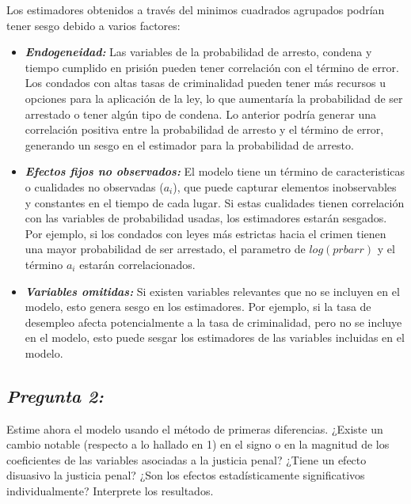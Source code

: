 \documentclass[
  12pt,
]{article}
\begin{document}
Los estimadores obtenidos a través del minimos cuadrados agrupados
podrían tener sesgo debido a varios factores:

\begin{itemize}
\item
  \textbf{\emph{Endogeneidad:}} Las variables de la probabilidad de
  arresto, condena y tiempo cumplido en prisión pueden tener correlación
  con el término de error. Los condados con altas tasas de criminalidad
  pueden tener más recursos u opciones para la aplicación de la ley, lo
  que aumentaría la probabilidad de ser arrestado o tener algún tipo de
  condena. Lo anterior podría generar una correlación positiva entre la
  probabilidad de arresto y el término de error, generando un sesgo en
  el estimador para la probabilidad de arresto.
\item
  \textbf{\emph{Efectos fijos no observados:}} El modelo tiene un
  término de caracteristicas o cualidades no observadas (\(a_i\)), que
  puede capturar elementos inobservables y constantes en el tiempo de
  cada lugar. Si estas cualidades tienen correlación con las variables
  de probabilidad usadas, los estimadores estarán sesgados. Por ejemplo,
  si los condados con leyes más estrictas hacia el crimen tienen una
  mayor probabilidad de ser arrestado, el parametro de \(log(prbarr)\) y
  el término \(a_i\) estarán correlacionados.
\item
  \textbf{\emph{Variables omitidas:}} Si existen variables relevantes
  que no se incluyen en el modelo, esto genera sesgo en los estimadores.
  Por ejemplo, si la tasa de desempleo afecta potencialmente a la tasa
  de criminalidad, pero no se incluye en el modelo, esto puede sesgar
  los estimadores de las variables incluidas en el modelo.
\end{itemize}

\subsection{\texorpdfstring{\textbf{\emph{Pregunta
2:}}}{Pregunta 2:}}\label{pregunta-2}

Estime ahora el modelo usando el método de primeras diferencias. ¿Existe
un cambio notable (respecto a lo hallado en 1) en el signo o en la
magnitud de los coeficientes de las variables asociadas a la justicia
penal? ¿Tiene un efecto disuasivo la justicia penal? ¿Son los efectos
estadísticamente significativos individualmente? Interprete los
resultados.
\end{document}
